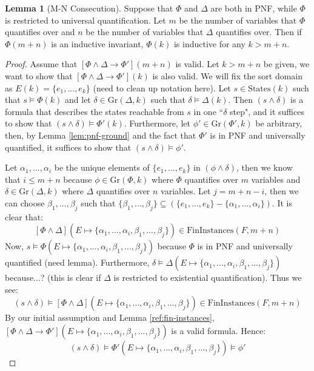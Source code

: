 \documentclass[12pt]{article}
\theoremstyle{definition}
\newtheorem{lemma}{Lemma}
\theoremstyle{remark}
\newcommand{\states}{\text{States}}
\newcommand{\gr}{\text{Gr}}
\newcommand{\fininstances}{\text{FinInstances}}
\begin{document}
\begin{lemma}[M-N Consecution]
  Suppose that $\Phi$ and $\Delta$ are both in PNF, while $\Phi$ is restricted to universal quantification.  Let $m$ be the number of variables that $\Phi$ quantifies over and $n$ be the number of variables that $\Delta$ quantifies over.  Then if $\Phi(m+n)$ is an inductive invariant, $\Phi(k)$ is inductive for any $k>m+n$.
\end{lemma}
\begin{proof}
  Assume that $[\Phi\land\Delta \rightarrow \Phi'](m+n)$ is valid.  Let $k>m+n$ be given, we want to show that $[\Phi\land\Delta \rightarrow \Phi'](k)$ is also valid.  We will fix the sort domain as $E(k) = \{e_1,...,e_k\}$ (need to clean up notation here).  Let $s \in \states(k)$ such that $s \models \Phi(k)$ and let $\delta \in \gr(\Delta,k)$ such that $\delta \models \Delta(k)$.  Then $(s \land \delta)$ is a formula that describes the states reachable from $s$ in one ``$\delta$ step", and it suffices to show that $(s \land \delta) \models \Phi'(k)$.  Furthermore, let $\phi' \in \gr(\Phi',k)$ be arbitrary, then, by Lemma \ref{lem:pnf-ground} and the fact that $\Phi'$ is in PNF and universally quantified, it suffices to show that $(s \land \delta) \models \phi'$.

  Let $\alpha_1,...,\alpha_i$ be the unique elements of $\{e_1,...,e_k\}$ in $(\phi \land \delta)$, then we know that $i \leq m+n$ because $\phi \in \gr(\Phi,k)$ where $\Phi$ quantifies over $m$ variables and $\delta \in \gr(\Delta,k)$ where $\Delta$ quantifies over $n$ variables.  Let $j = m+n-i$, then we can choose $\beta_1,...,\beta_j$ such that $\{\beta_1,...,\beta_j\} \subseteq (\{e_1,...,e_k\}-\{\alpha_1,...,\alpha_i\})$.  It is clear that:
  $$[\Phi\land\Delta](E \mapsto \{\alpha_1,...,\alpha_i,\beta_1,...,\beta_j\}) \in \fininstances(F,m+n)$$
  Now, $s \models \Phi(E \mapsto \{\alpha_1,...,\alpha_i,\beta_1,...,\beta_j\})$ because $\Phi$ is in PNF and universally quantified (need lemma).  Furthermore, $\delta \models \Delta(E \mapsto \{\alpha_1,...,\alpha_i,\beta_1,...,\beta_j\})$ because...? (this is clear if $\Delta$ is restricted to existential quantification).  Thus we see:
  $$(s \land \delta) \models [\Phi\land\Delta](E \mapsto \{\alpha_1,...,\alpha_i,\beta_1,...,\beta_j\}) \in \fininstances(F,m+n)$$
  By our initial assumption and Lemma \ref{ref:fin-instances}, $[\Phi\land\Delta \rightarrow \Phi'](E \mapsto \{\alpha_1,...,\alpha_i,\beta_1,...,\beta_j\})$ is a valid formula.  Hence:
  $$(s \land \delta) \models \Phi'(E \mapsto \{\alpha_1,...,\alpha_i,\beta_1,...,\beta_j\}) \models \phi'$$
\end{proof}
\end{document}
